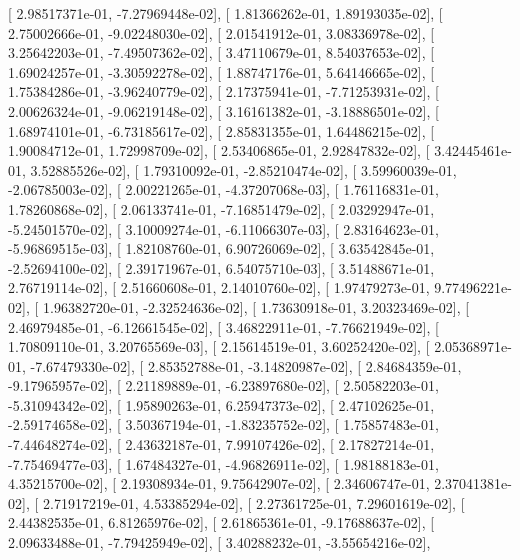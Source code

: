 \documentclass{article}
\begin{document}
       [  2.98517371e-01,  -7.27969448e-02],
       [  1.81366262e-01,   1.89193035e-02],
       [  2.75002666e-01,  -9.02248030e-02],
       [  2.01541912e-01,   3.08336978e-02],
       [  3.25642203e-01,  -7.49507362e-02],
       [  3.47110679e-01,   8.54037653e-02],
       [  1.69024257e-01,  -3.30592278e-02],
       [  1.88747176e-01,   5.64146665e-02],
       [  1.75384286e-01,  -3.96240779e-02],
       [  2.17375941e-01,  -7.71253931e-02],
       [  2.00626324e-01,  -9.06219148e-02],
       [  3.16161382e-01,  -3.18886501e-02],
       [  1.68974101e-01,  -6.73185617e-02],
       [  2.85831355e-01,   1.64486215e-02],
       [  1.90084712e-01,   1.72998709e-02],
       [  2.53406865e-01,   2.92847832e-02],
       [  3.42445461e-01,   3.52885526e-02],
       [  1.79310092e-01,  -2.85210474e-02],
       [  3.59960039e-01,  -2.06785003e-02],
       [  2.00221265e-01,  -4.37207068e-03],
       [  1.76116831e-01,   1.78260868e-02],
       [  2.06133741e-01,  -7.16851479e-02],
       [  2.03292947e-01,  -5.24501570e-02],
       [  3.10009274e-01,  -6.11066307e-03],
       [  2.83164623e-01,  -5.96869515e-03],
       [  1.82108760e-01,   6.90726069e-02],
       [  3.63542845e-01,  -2.52694100e-02],
       [  2.39171967e-01,   6.54075710e-03],
       [  3.51488671e-01,   2.76719114e-02],
       [  2.51660608e-01,   2.14010760e-02],
       [  1.97479273e-01,   9.77496221e-02],
       [  1.96382720e-01,  -2.32524636e-02],
       [  1.73630918e-01,   3.20323469e-02],
       [  2.46979485e-01,  -6.12661545e-02],
       [  3.46822911e-01,  -7.76621949e-02],
       [  1.70809110e-01,   3.20765569e-03],
       [  2.15614519e-01,   3.60252420e-02],
       [  2.05368971e-01,  -7.67479330e-02],
       [  2.85352788e-01,  -3.14820987e-02],
       [  2.84684359e-01,  -9.17965957e-02],
       [  2.21189889e-01,  -6.23897680e-02],
       [  2.50582203e-01,  -5.31094342e-02],
       [  1.95890263e-01,   6.25947373e-02],
       [  2.47102625e-01,  -2.59174658e-02],
       [  3.50367194e-01,  -1.83235752e-02],
       [  1.75857483e-01,  -7.44648274e-02],
       [  2.43632187e-01,   7.99107426e-02],
       [  2.17827214e-01,  -7.75469477e-03],
       [  1.67484327e-01,  -4.96826911e-02],
       [  1.98188183e-01,   4.35215700e-02],
       [  2.19308934e-01,   9.75642907e-02],
       [  2.34606747e-01,   2.37041381e-02],
       [  2.71917219e-01,   4.53385294e-02],
       [  2.27361725e-01,   7.29601619e-02],
       [  2.44382535e-01,   6.81265976e-02],
       [  2.61865361e-01,  -9.17688637e-02],
       [  2.09633488e-01,  -7.79425949e-02],
       [  3.40288232e-01,  -3.55654216e-02],
\end{document}
